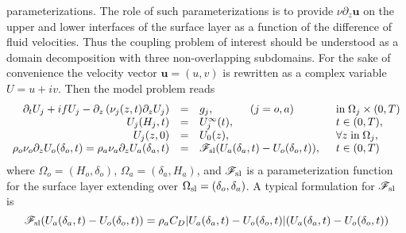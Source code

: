 parameterizations. The role of such parameterizations is to provide 
$\nu \partial_z \mathbf{u}$ on the upper and lower interfaces of the 
surface layer as a function of the difference of fluid velocities.
Thus the coupling problem of interest should be understood as a domain
decomposition with three non-overlapping subdomains. For the sake 
of convenience the velocity vector $\mathbf{u} = (u,v)$ 
is rewritten as a complex variable $U = u + i v$. Then the model problem reads   
\begin{equation}
\label{eq:cplProblem}
\begin{array}{rcll}
\partial_t U_j + i f U_j - \partial_z \left( \nu_j(z,t) \partial_z U_j \right) &=& g_j,
~~~~~~~~~~ (j=o,a)
& \mbox{in}\;\Omega_j \times (0,T)\\
U_j(H_j,t) &=& U_j^\infty(t),  & t \in (0,T), \\ 
U_j(z,0) &=& U_0(z), & \forall z \; \mbox{in}\; \Omega_j, \\
\rho_o \nu_o \partial_z U_o(\delta_o,t) = \rho_a \nu_a \partial_z U_a(\delta_a,t)
&=& {\cal F}_{\rm sl}( U_a(\delta_a,t)-U_o(\delta_o,t) ), \;\; & t \in (0,T)
\end{array}
\end{equation}
where $\Omega_o= (H_o,\delta_o)$, $\Omega_a = (\delta_a,H_a)$, and 
${\cal F}_{\rm sl}$ is a parameterization function for the surface layer 
extending over $\Omega_{\rm sl} = (\delta_o,\delta_a)$. A typical 
formulation for ${\cal F}_{\rm sl}$ is
\[
{\cal F}_{\rm sl}( U_a(\delta_a,t)-U_o(\delta_o,t) ) = 
\rho_a C_D | U_a(\delta_a,t)-U_o(\delta_o,t) | (U_a(\delta_a,t)-U_o(\delta_o,t))
\]
